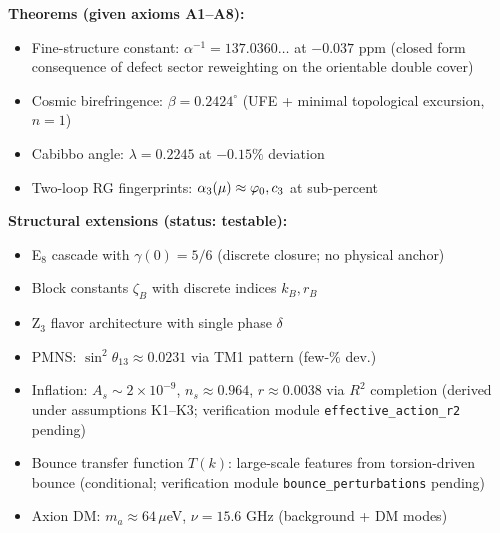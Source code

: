 \vspace{1em}
\begin{tcolorbox}[colback=gray!5, colframe=gray!60, title={\textbf{Claim Map: What This Paper Establishes}}, fonttitle=\bfseries]
\textbf{Theorems (given axioms A1--A8):}
\begin{itemize}[leftmargin=1.5em, topsep=2pt, itemsep=1pt]
    \item Fine-structure constant: $\alpha^{-1} = 137.0360\ldots$ at $-0.037$ ppm (closed form consequence of defect sector reweighting on the orientable double cover)
    \item Cosmic birefringence: $\beta = 0.2424^\circ$ (UFE + minimal topological excursion, $n=1$)
    \item Cabibbo angle: $\lambda = 0.2245$ at $-0.15\%$ deviation
    \item Two-loop RG fingerprints: $\alpha_3(\mu) \approx \varphi_0, c_3$ at sub-percent
\end{itemize}

\textbf{Structural extensions (status: testable):}
\begin{itemize}[leftmargin=1.5em, topsep=2pt, itemsep=1pt]
    \item E$_8$ cascade with $\gamma(0)=5/6$ (discrete closure; no physical anchor)
    \item Block constants $\zeta_B$ with discrete indices $k_B, r_B$
    \item Z$_3$ flavor architecture with single phase $\delta$
    \item PMNS: $\sin^2\theta_{13} \approx 0.0231$ via TM1 pattern (few-\% dev.)
    \item Inflation: $A_s \sim 2\times10^{-9}$, $n_s \approx 0.964$, $r \approx 0.0038$ via $R^2$ completion (derived under assumptions K1--K3; verification module \texttt{effective\_action\_r2} pending)
    \item Bounce transfer function $T(k)$: large-scale features from torsion-driven bounce (conditional; verification module \texttt{bounce\_perturbations} pending)
    \item Axion DM: $m_a \approx 64\,\mu$eV, $\nu = 15.6$ GHz (background + DM modes)
\end{itemize}


\end{tcolorbox}
